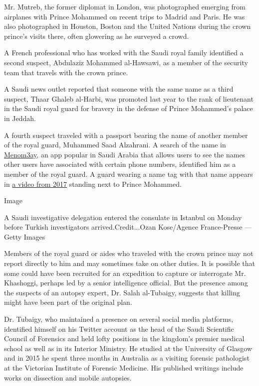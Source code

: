 Mr. Mutreb, the former diplomat in London, was photographed emerging
from airplanes with Prince Mohammed on recent trips to Madrid and Paris.
He was also photographed in Houston, Boston and the United Nations
during the crown prince's visits there, often glowering as he surveyed a
crowd.

A French professional who has worked with the Saudi royal family
identified a second suspect, Abdulaziz Mohammed al-Hawsawi, as a member
of the security team that travels with the crown prince.

A Saudi news outlet reported that someone with the same name as a third
suspect, Thaar Ghaleb al-Harbi, was promoted last year to the rank of
lieutenant in the Saudi royal guard for bravery in the defense of Prince
Mohammed's palace in Jeddah.

A fourth suspect traveled with a passport bearing the name of another
member of the royal guard, Muhammed Saad Alzahrani. A search of the name
in \href{https://www.menom3ay.com/home.php}{Menom3ay}, an app popular in
Saudi Arabia that allows users to see the names other users have
associated with certain phone numbers, identified him as a member of the
royal guard. A guard wearing a name tag with that name appears in
\href{https://www.youtube.com/watch?v=-U9hr9z5jiA\&feature=youtu.be\&t=68}{a
video from 2017} standing next to Prince Mohammed.

Image

A Saudi investigative delegation entered the consulate in Istanbul on
Monday before Turkish investigators arrived.Credit...Ozan Kose/Agence
France-Presse --- Getty Images

Members of the royal guard or aides who traveled with the crown prince
may not report directly to him and may sometimes take on other duties.
It is possible that some could have been recruited for an expedition to
capture or interrogate Mr. Khashoggi, perhaps led by a senior
intelligence official. But the presence among the suspects of an autopsy
expert, Dr. Salah al-Tubaigy, suggests that killing might have been part
of the original plan.

Dr. Tubaigy, who maintained a presence on several social media
platforms, identified himself on his Twitter account as the head of the
Saudi Scientific Council of Forensics and held lofty positions in the
kingdom's premier medical school as well as in its Interior Ministry. He
studied at the University of Glasgow and in 2015 he spent three months
in Australia as a visiting forensic pathologist at the Victorian
Institute of Forensic Medicine. His published writings include works on
dissection and mobile autopsies.

